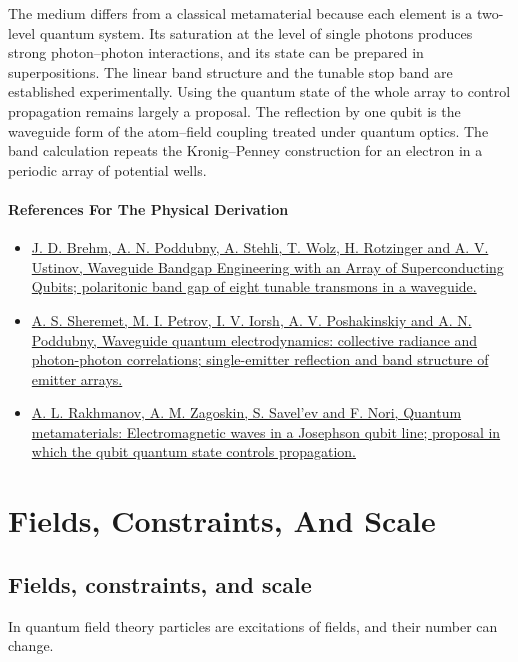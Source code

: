 \documentclass[11pt,oneside]{book}
\begin{document}
The medium differs from a classical metamaterial because each element is a two-level quantum system. Its saturation at the level of single photons produces strong photon--photon interactions, and its state can be prepared in superpositions. The linear band structure and the tunable stop band are established experimentally. Using the quantum state of the whole array to control propagation remains largely a proposal. The reflection by one qubit is the waveguide form of the atom--field coupling treated under quantum optics. The band calculation repeats the Kronig--Penney construction for an electron in a periodic array of potential wells.

\subsection*{References For The Physical Derivation}
\begin{itemize}
\item \href{https://arxiv.org/abs/2006.03330}{J. D. Brehm, A. N. Poddubny, A. Stehli, T. Wolz, H. Rotzinger and A. V. Ustinov, Waveguide Bandgap Engineering with an Array of Superconducting Qubits; polaritonic band gap of eight tunable transmons in a waveguide.}
\item \href{https://arxiv.org/abs/2103.06824}{A. S. Sheremet, M. I. Petrov, I. V. Iorsh, A. V. Poshakinskiy and A. N. Poddubny, Waveguide quantum electrodynamics: collective radiance and photon-photon correlations; single-emitter reflection and band structure of emitter arrays.}
\item \href{https://arxiv.org/abs/0709.1314}{A. L. Rakhmanov, A. M. Zagoskin, S. Savel'ev and F. Nori, Quantum metamaterials: Electromagnetic waves in a Josephson qubit line; proposal in which the qubit quantum state controls propagation.}
\end{itemize}





\part{Fields, Constraints, And Scale}

\chapter{Fields, constraints, and scale}

\begin{claimbox}

In quantum field theory particles are excitations of fields, and their number can change.

\end{claimbox}
\end{document}
